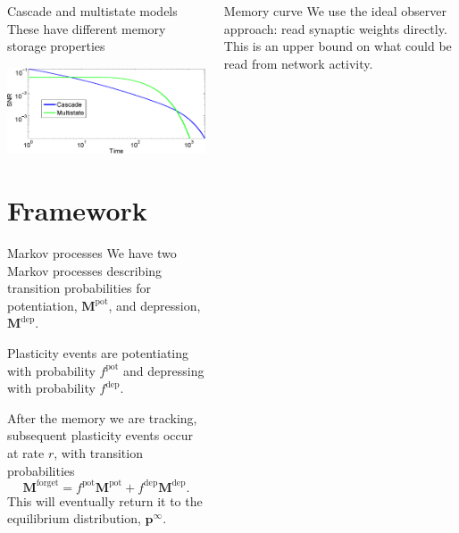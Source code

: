\documentclass[final,hyperref={pdfpagelabels=false,bookmarks=false}]{beamer}
\newcommand{\pot}{^\text{pot}}
\newcommand{\dep}{^\text{dep}}
\newcommand{\frg}{^\text{forget}}
\newcommand{\eq}{\mathbf{p}^\infty}
\newcommand{\M}{\mathbf{M}}
\begin{document}
\begin{frame}{}
\begin{columns}[t]
\begin{column}{0.32\linewidth}
\begin{block}{Cascade and multistate models}
 These have different memory storage properties
 \begin{center}
 \includegraphics[width=20cm]{cascms.eps}
 \end{center}
%
\end{block}



\section{Framework}


\begin{block}{Markov processes}
%
 We have two Markov processes describing transition probabilities for potentiation, $\M\pot$, and depression, $\M\dep$.

 \vp Plasticity events are potentiating with probability $f\pot$ and depressing with probability $f\dep$.

 \vp After the memory we are tracking, subsequent plasticity events occur at rate $r$, with transition probabilities
 \begin{equation*}
   \M\frg = f\pot\M\pot + f\dep\M\dep.
 \end{equation*}
 This will eventually return it to the equilibrium distribution, $\eq$.
%
\end{block}

\end{column}

\begin{column}{0.32\linewidth}


\begin{block}{Memory curve}
%
 We use the ideal observer approach: read synaptic weights directly.
 This is an upper bound on what could be read from network activity.


\end{block}
\end{column}
\end{columns}
\end{frame}
\end{document}
